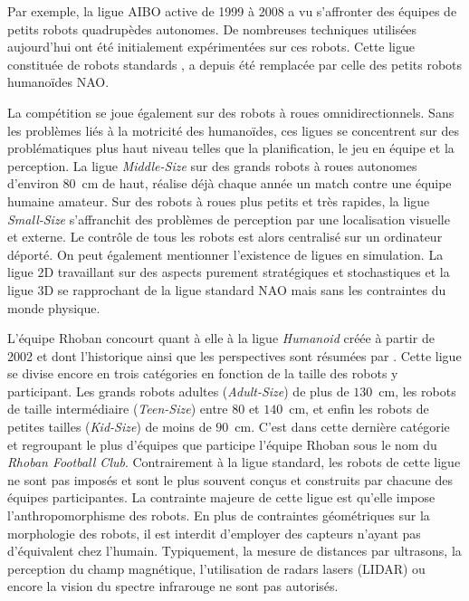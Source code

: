 Par exemple, la ligue AIBO active de 1999 à 2008 a vu s'affronter
des équipes de petits robots quadrupèdes autonomes. 
De nombreuses techniques utilisées aujourd'hui ont été initialement
expérimentées sur ces robots.
Cette ligue constituée de robots \og standards \fg, a depuis été remplacée
par celle des petits robots humanoïdes NAO.

La compétition se joue également sur des robots à roues omnidirectionnels.
Sans les problèmes liés à la motricité des humanoïdes, 
ces ligues se concentrent sur des problématiques plus \og haut niveau \fg 
telles que la planification, le jeu en équipe et la perception.
La ligue \textit{Middle-Size} sur des grands robots à roues autonomes 
d'environ $80$~cm de haut, réalise déjà chaque année un match
contre une équipe humaine amateur.
Sur des robots à roues plus petits et très rapides, 
la ligue \textit{Small-Size} s'affranchit des problèmes de perception
par une localisation visuelle et externe.
Le contrôle de tous les robots est alors centralisé sur un ordinateur déporté.
On peut également mentionner l'existence de ligues en simulation.
La ligue 2D travaillant sur des aspects purement stratégiques et stochastiques
et la ligue 3D se rapprochant de la ligue standard NAO mais 
sans les contraintes du monde physique.

L'équipe Rhoban concourt quant à elle à la ligue \textit{Humanoid} créée 
à partir de 2002 et dont l'historique ainsi que les perspectives 
sont résumées par \cite{gerndt_humanoid_2015}.
Cette ligue se divise encore en trois catégories en fonction de la taille 
des robots y participant.
Les grands robots \og adultes \fg (\textit{Adult-Size}) de plus de $130$~cm, 
les robots de taille intermédiaire (\textit{Teen-Size}) entre $80$ et $140$~cm,
et enfin les robots de petites tailles (\textit{Kid-Size}) de moins de $90$~cm.
C'est dans cette dernière catégorie et regroupant le plus d'équipes que participe 
l'équipe Rhoban sous le nom du \textit{Rhoban Football Club}.
Contrairement à la ligue standard, les robots de cette ligue ne sont pas imposés
et sont le plus souvent conçus et construits par chacune des équipes participantes.
La contrainte majeure de cette ligue est qu'elle impose l'anthropomorphisme des robots.
En plus de contraintes géométriques sur la morphologie des robots, il est interdit
d'employer des capteurs n'ayant pas d'équivalent chez l'humain.
Typiquement, la mesure de distances par ultrasons, la perception du champ magnétique, 
l'utilisation de radars lasers (LIDAR) ou encore la vision du spectre infrarouge 
ne sont pas autorisés.

